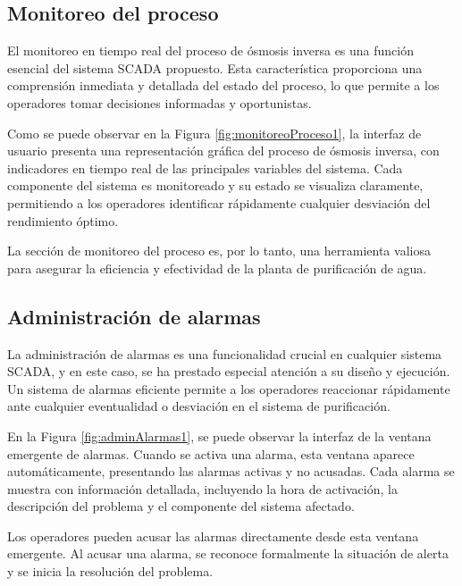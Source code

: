 \subsection{Monitoreo del proceso}

El monitoreo en tiempo real del proceso de ósmosis inversa es una función esencial del sistema SCADA propuesto. Esta característica proporciona una comprensión inmediata y detallada del estado del proceso, lo que permite a los operadores tomar decisiones informadas y oportunistas.


Como se puede observar en la Figura \ref{fig:monitoreoProceso1}, la interfaz de usuario presenta una representación gráfica del proceso de ósmosis inversa, con indicadores en tiempo real de las principales variables del sistema. Cada componente del sistema es monitoreado y su estado se visualiza claramente, permitiendo a los operadores identificar rápidamente cualquier desviación del rendimiento óptimo.

La sección de monitoreo del proceso es, por lo tanto, una herramienta valiosa para asegurar la eficiencia y efectividad de la planta de purificación de agua.

\subsection{Administración de alarmas}

La administración de alarmas es una funcionalidad crucial en cualquier sistema SCADA, y en este caso, se ha prestado especial atención a su diseño y ejecución. Un sistema de alarmas eficiente permite a los operadores reaccionar rápidamente ante cualquier eventualidad o desviación en el sistema de purificación.


En la Figura \ref{fig:adminAlarmas1}, se puede observar la interfaz de la ventana emergente de alarmas. Cuando se activa una alarma, esta ventana aparece automáticamente, presentando las alarmas activas y no acusadas. Cada alarma se muestra con información detallada, incluyendo la hora de activación, la descripción del problema y el componente del sistema afectado.


Los operadores pueden acusar las alarmas directamente desde esta ventana emergente. Al acusar una alarma, se reconoce formalmente la situación de alerta y se inicia la resolución del problema.


